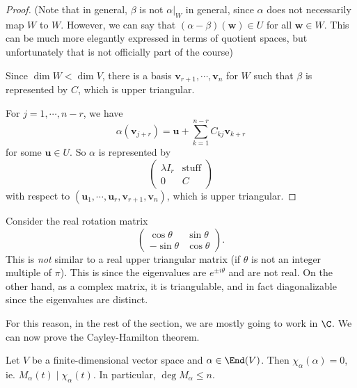 \documentclass[a4paper]{article}
\begin{document}
\begin{proof}
  (Note that in general, $\beta$ is not $\alpha|_W$ in general, since $\alpha$ does not necessarily map $W$ to $W$. However, we can say that $(\alpha - \beta) (\mathbf{w}) \in U$ for all $\mathbf{w}\in W$. This can be much more elegantly expressed in terms of quotient spaces, but unfortunately that is not officially part of the course)

  Since $\dim W < \dim V$, there is a basis $\mathbf{v}_{r + 1}, \cdots, \mathbf{v}_n$ for $W$ such that $\beta$ is represented by $C$, which is upper triangular.

  For $j = 1, \cdots, n - r$, we have
  \[
    \alpha(\mathbf{v}_{j + r}) = \mathbf{u} + \sum_{k = 1}^{n - r} C_{kj} \mathbf{v}_{k + r}
  \]
  for some $\mathbf{u} \in U$. So $\alpha$ is represented by
  \[
    \begin{pmatrix}
      \lambda I_r & \text{stuff}\\
      0 & C
    \end{pmatrix}
  \]
  with respect to $(\mathbf{u}_1, \cdots, \mathbf{u}_r, \mathbf{v}_{r + 1}, \mathbf{v}_n)$, which is upper triangular.
\end{proof}

\begin{eg}
  Consider the real rotation matrix
  \[
    \begin{pmatrix}
      \cos \theta & \sin \theta\\
      -\sin \theta & \cos \theta
    \end{pmatrix}.
  \]
  This is \emph{not} similar to a real upper triangular matrix (if $\theta$ is not an integer multiple of $\pi$). This is since the eigenvalues are $e^{\pm i\theta}$ and are not real. On the other hand, as a complex matrix, it is triangulable, and in fact diagonalizable since the eigenvalues are distinct.
\end{eg}
For this reason, in the rest of the section, we are mostly going to work in $\C$. We can now prove the Cayley-Hamilton theorem.

\begin{thm}
  Let $V$ be a finite-dimensional vector space and $\alpha \in \End(V)$. Then $\chi_\alpha(\alpha) = 0$, ie. $M_\alpha(t) \mid \chi_\alpha(t)$. In particular, $\deg M_\alpha \leq n$.
\end{thm}
\end{document}
